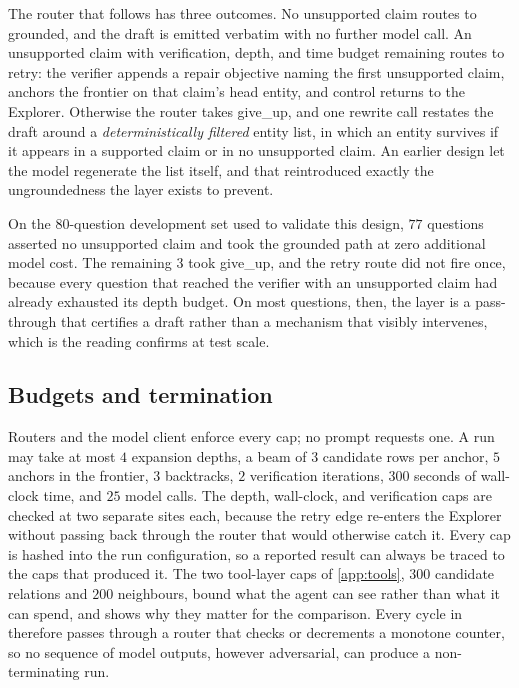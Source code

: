 The router that follows has three outcomes. No unsupported claim routes
to \textsf{grounded}, and the draft is emitted verbatim with no further
model call. An unsupported claim with verification, depth, and time
budget remaining routes to \textsf{retry}: the verifier appends a repair
objective naming the first unsupported claim, anchors the frontier on
that claim's head entity, and control returns to the Explorer. Otherwise
the router takes \textsf{give\_up}, and one rewrite call restates the
draft around a \emph{deterministically filtered} entity list, in which
an entity survives if it appears in a supported claim or in no
unsupported claim. An earlier design let the model regenerate the list
itself, and that reintroduced exactly the ungroundedness the layer
exists to prevent.

On the $80$-question development set used to validate this design, $77$
questions asserted no unsupported claim and took the grounded path at
zero additional model cost. The remaining $3$ took \textsf{give\_up},
and the retry route did not fire once, because every question that
reached the verifier with an unsupported claim had already exhausted its
depth budget. On most questions, then, the layer is a pass-through that
certifies a draft rather than a mechanism that visibly intervenes, which
is the reading  confirms at test scale.

\subsection{Budgets and termination}\label{sec:budgets}

Routers and the model client enforce every cap; no prompt requests one.
A run may take at most $4$ expansion depths, a beam of $3$ candidate
rows per anchor, $5$ anchors in the frontier, $3$ backtracks, $2$
verification iterations, $300$ seconds of wall-clock time, and $25$
model calls. The depth, wall-clock, and verification caps are checked at
two separate sites each, because the \textsf{retry} edge re-enters the
Explorer without passing back through the router that would otherwise
catch it. Every cap is hashed into the run configuration, so a reported
result can always be traced to the caps that produced it. The two
tool-layer caps of \ref{app:tools}, $300$ candidate relations and $200$
neighbours, bound what the agent can see rather than what it can spend,
and  shows why they matter for the comparison. Every
cycle in  therefore passes through a router that
checks or decrements a monotone counter, so no sequence of model
outputs, however adversarial, can produce a non-terminating run.


